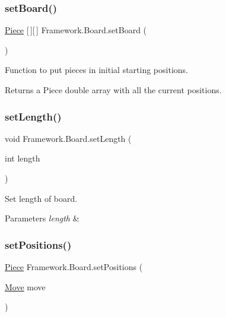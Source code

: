 \subsubsection{\texorpdfstring{set\+Board()}{setBoard()}}
{\footnotesize\ttfamily \hyperlink{class_framework_1_1_pieces_1_1_piece}{Piece} \mbox{[}$\,$\mbox{]}\mbox{[}$\,$\mbox{]} Framework.\+Board.\+set\+Board (\begin{DoxyParamCaption}{ }\end{DoxyParamCaption})}

Function to put pieces in initial starting positions. \begin{DoxyReturn}{Returns}
a Piece double array with all the current positions. 
\end{DoxyReturn}
\hypertarget{class_framework_1_1_board_a769180cd9bd18fb08aa47a31892714e2}{}\label{class_framework_1_1_board_a769180cd9bd18fb08aa47a31892714e2} 
\subsubsection{\texorpdfstring{set\+Length()}{setLength()}}
{\footnotesize\ttfamily void Framework.\+Board.\+set\+Length (\begin{DoxyParamCaption}\item[{int}]{length }\end{DoxyParamCaption})}

Set length of board. 
\begin{DoxyParams}{Parameters}
{\em length} & \\
\hline
\end{DoxyParams}
\hypertarget{class_framework_1_1_board_a1253153abd89d5ec2556dda59497fa43}{}\label{class_framework_1_1_board_a1253153abd89d5ec2556dda59497fa43} 
\subsubsection{\texorpdfstring{set\+Positions()}{setPositions()}}
{\footnotesize\ttfamily \hyperlink{class_framework_1_1_pieces_1_1_piece}{Piece} Framework.\+Board.\+set\+Positions (\begin{DoxyParamCaption}\item[{\hyperlink{class_framework_1_1_move}{Move}}]{move }\end{DoxyParamCaption})}

